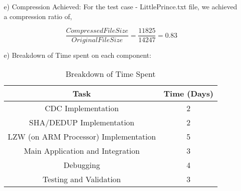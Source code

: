 \documentclass[../main.tex]{subfiles}
\begin{document}
\begin{enumerate}
        \newpage

        \item[e)] Compression Achieved:
        For the test case - LittlePrince.txt file, we achieved a compression ratio of,

        $$
        \frac{CompressedFileSize}{OriginalFileSize} = \frac{11825}{14247} = 0.83
        $$

        \item[e)] Breakdown of Time spent on each component:
            
            \begin{table}[H]
                \centering
                \begin{tabular}{|c|c|} \hline 
                     \textbf{Task}& \textbf{Time (Days)}\\ \hline 
                     CDC Implementation& 2\\ \hline 
                      SHA/DEDUP Implementation& 2\\ \hline 
                     LZW (on ARM Processor) Implementation& 5\\ \hline 
                     Main Application and Integration& 3\\ \hline 
                     Debugging& 4\\ \hline
                     Testing and Validation& 3\\ \hline
                \end{tabular}
                \caption{Breakdown of Time Spent}
                \label{tab:time_spent}
            \end{table}
\end{enumerate}
\end{document}
